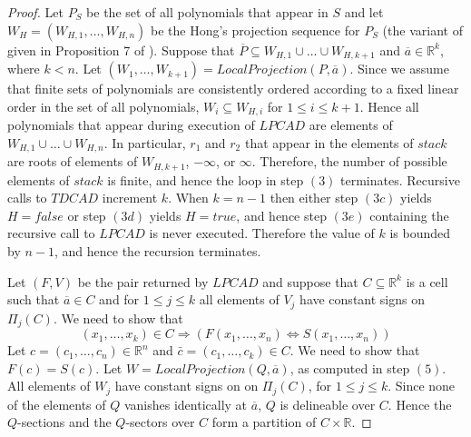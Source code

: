 \documentclass[english]{amsart}
\numberwithin{equation}{section}
\numberwithin{figure}{section}
\begin{document}
\begin{proof}
Let $P_{S}$ be the set of all polynomials that appear in $S$ and
let $W_{H}=(W_{H,1},\ldots,W_{H,n})$ be the Hong's projection sequence
\cite{H} for $P_{S}$ (the variant of given in Proposition 7 of \cite{S9}).
Suppose that $\overline{P}\subseteq W_{H,1}\cup\ldots\cup W_{H,k+1}$
and $\overline{a}\in\mathbb{R}^{k}$, where $k<n$. Let $(W_{1},\ldots,W_{k+1})=LocalProjection(P,\overline{a})$.
Since we assume that finite sets of polynomials are consistently ordered
according to a fixed linear order in the set of all polynomials, $W_{i}\subseteq W_{H,i}$
for $1\leq i\leq k+1$. Hence all polynomials that appear during execution
of $LPCAD$ are elements of $W_{H,1}\cup\ldots\cup W_{H,n}$. In particular,
$r_{1}$ and $r_{2}$ that appear in the elements of $stack$ are
roots of elements of $W_{H,k+1}$, $-\infty$, or $\infty$. Therefore,
the number of possible elements of $stack$ is finite, and hence the
loop in step $(3)$ terminates. Recursive calls to $TDCAD$ increment
$k$. When $k=n-1$ then either step $(3c)$ yields $H=false$ or
step $(3d)$ yields $H=true$, and hence step $(3e)$ containing the
recursive call to $LPCAD$ is never executed. Therefore the value
of $k$ is bounded by $n-1$, and hence the recursion terminates.

Let $(F,V)$ be the pair returned by $LPCAD$ and suppose that $C\subseteq\mathbb{R}^{k}$
is a cell such that $\overline{a}\in C$ and for $1\leq j\leq k$
all elements of $V_{j}$ have constant signs on $\Pi_{j}(C)$. We
need to show that\emph{ }\[
(x_{1},\ldots,x_{k})\in C\Rightarrow\left(F(x_{1},\ldots,x_{n})\Longleftrightarrow S(x_{1},\ldots,x_{n})\right)\]
Let $c=(c_{1},\ldots,c_{n})\in\mathbb{R}^{n}$ and $\bar{c}=(c_{1},\ldots,c_{k})\in C$.
We need to show that $F(c)=S(c)$. Let $W=LocalProjection(Q,\overline{a})$,
as computed in step $(5)$. All elements of $W_{j}$ have constant
signs on on $\Pi_{j}(C)$, for $1\leq j\leq k$. Since none of the
elements of $Q$ vanishes identically at $\overline{a}$, $Q$ is
delineable over $C$. Hence the $Q$-sections and the $Q$-sectors
over $C$ form a partition of $C\times\mathbb{R}$. 


\end{proof}
\end{document}
